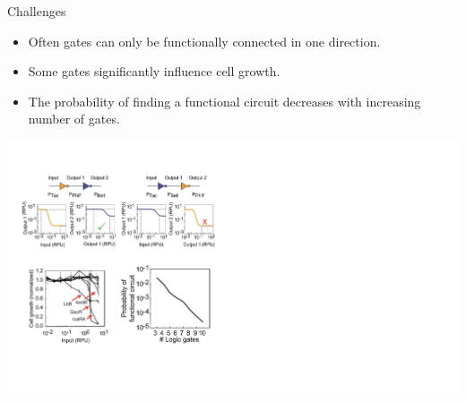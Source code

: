 \documentclass[10pt]{beamer}
\begin{document}
\begin{frame}{Challenges}
    \centering
    \begin{minipage}{.4\textwidth}
        \centering
        \begin{itemize}
            \item Often gates can only be functionally connected in one direction.
            \item Some gates significantly influence cell growth.
            \item The probability of finding a functional circuit decreases with increasing number of gates. 
        \end{itemize}
    \end{minipage}%
    \begin{minipage}{.6\textwidth}
        \centering
        \includegraphics[width=15cm]{challenges.jpg}
    \end{minipage}
\end{frame}
\end{document}
